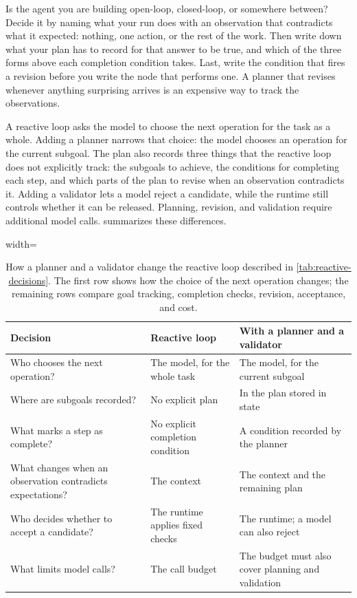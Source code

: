 \begin{foodforthought}
Is the agent you are building open-loop, closed-loop, or somewhere between? Decide it by naming what
your run does with an observation that contradicts what it expected: nothing, one action, or the
rest of the work. Then write down what your plan has to record for that answer to be true, and which
of the three forms above each completion condition takes. Last, write the condition that fires a
revision before you write the node that performs one. A planner that revises whenever anything
surprising arrives is an expensive way to track the observations.
\end{foodforthought}


A reactive loop asks the model to choose the next operation for the task as a whole. Adding a
planner narrows that choice: the model chooses an operation for the current subgoal. The plan also
records three things that the reactive loop does not explicitly track: the subgoals to achieve,
the conditions for completing each step, and which parts of the plan to revise when an observation
contradicts it. Adding a validator lets a model reject a candidate, while the runtime still controls
whether it can be released. Planning, revision, and validation require additional model calls.
 summarizes these differences.

\begin{table}[htbp]
  \caption{How a planner and a validator change the reactive loop described in
  \cref{tab:reactive-decisions}. The first row shows how the choice of the next operation changes;
  the remaining rows compare goal tracking, completion checks, revision, acceptance, and cost.}
  \label{tab:planning-decisions}
  \begin{adjustbox}{width=\linewidth}\begin{tabularx}{\linewidth}{XXX}
    \toprule
    Decision & Reactive loop & With a planner and a validator \\
    \midrule
    Who chooses the next operation? & The model, for the whole task & The model, for the current subgoal \\
    \midrule
    Where are subgoals recorded? & No explicit plan & In the plan stored in state \\
    What marks a step as complete? & No explicit completion condition & A condition recorded by the planner \\
    What changes when an observation contradicts expectations? & The context & The context and the remaining plan \\
    Who decides whether to accept a candidate? & The runtime applies fixed checks & The runtime; a model can also reject \\
    What limits model calls? & The call budget & The budget must also cover planning and validation \\
    \bottomrule
  \end{tabularx}\end{adjustbox}
\end{table}

